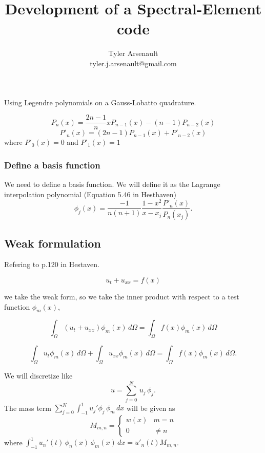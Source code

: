 \documentclass[12pt]{article}%
\title{Development of a Spectral-Element code}
\author{Tyler Arsenault\\ tyler.j.arsenault@gmail.com}
\date{}
\begin{document}
\maketitle

Using Legendre polynomials on a Gauss-Lobatto quadrature.

\begin{equation}
P_n(x)=\frac{2n-1}{n}xP_{n-1}(x)-(n-1)P_{n-2}(x)
\end{equation}
%
\begin{equation}P'_n(x)=(2n-1)P_{n-1}(x)+P'_{n-2}(x)
\end{equation}
where $P'_0(x)=0$ and $P'_1(x)=1$


\subsubsection*{Define a basis function}
We need to define a basis function.  We will define it as the Lagrange interpolation polynomial (Equation 5.46 in Hesthaven)
\begin{equation}
\phi_j(x)=\frac{-1}{n(n+1)}\frac{1-x^2}{x-x_j}\frac{P'_n(x)}{P_n(x_j)}
.\end{equation}


\subsection*{Weak formulation}

Refering to p.120 in Hestaven.

\begin{equation}
u_t+u_{xx}=f(x)
\end{equation}

we take the weak form, so we take the inner product with respect to a test function $\phi_m(x)$,

\begin{equation}
\int_{\Omega} \left(u_t + u_{xx}\right) \phi_m(x)\,d\Omega=\int_{\Omega} f(x)\phi_m(x)\,d\Omega
\end{equation}

\begin{equation}\int_{\Omega} u_t\phi_m(x)\,d\Omega +\int_{\Omega}u_{xx} \phi_m(x)\,d\Omega=\int_{\Omega} f(x)\phi_m(x)\,d\Omega.
\end{equation}

We will discretize like 
\begin{equation}
u=\sum_{j=0}^N\,u_j\,\phi_j.
\end{equation}
The mass term $\sum_{j=0}^N \int_{-1}^{1} u_j'\phi_j\,\phi_m\,dx$ will be given as  
\begin{equation}M_{m,n}=\begin{cases} w(x)& m=n \\ 0 & \neq n\end{cases}
\end{equation}
where $\int_{-1}^{1} u_n'(t)\, \phi_n(x)\,
\phi_m(x)\,dx=u'_n(t)M_{m,n}$.
\end{document}
